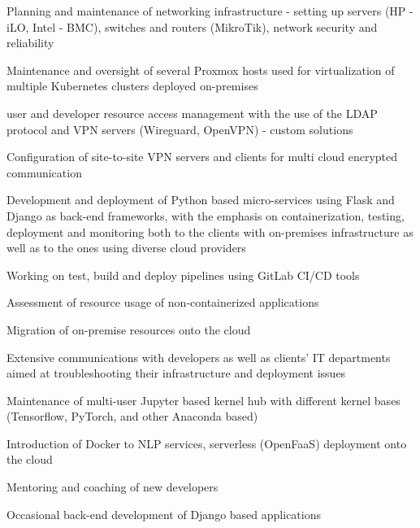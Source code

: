 \documentclass[]{lib/cv}
\begin{document}
\begin{minipage}[t]{0.65\textwidth}
\begin{tightemize}
\sectionsep
\item Planning and maintenance of networking infrastructure - setting up servers (HP - iLO, Intel -
      BMC), switches and routers (MikroTik), network security and reliability
\item Maintenance and oversight of several Proxmox hosts
      used for virtualization of multiple Kubernetes clusters deployed on-premises
\item user and developer resource access management with the use of the LDAP protocol and VPN servers
      (Wireguard, OpenVPN) - custom solutions 
\item Configuration of site-to-site VPN servers and clients for multi cloud encrypted communication
\item Development and deployment of Python based micro-services using Flask and Django as back-end frameworks,
      with the emphasis on containerization, testing, deployment and monitoring both to the clients
      with on-premises infrastructure as well as to the ones using diverse cloud providers
\item Working on test, build and deploy pipelines using GitLab CI/CD tools
\item Assessment of resource usage of non-containerized applications
\item Migration of on-premise resources onto the cloud
\item Extensive communications with developers as well as clients' IT departments aimed at troubleshooting
      their infrastructure and deployment issues
\item Maintenance of multi-user Jupyter based kernel hub with different kernel bases (Tensorflow,
      PyTorch, and other Anaconda based)
  \item Introduction of Docker to NLP services, serverless (OpenFaaS) deployment onto the cloud
\item Mentoring and coaching of new developers
\item Occasional back-end development of Django based applications
\end{tightemize}

\end{minipage} 
\hfill
\end{document}
